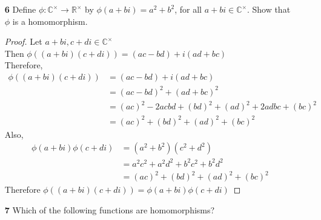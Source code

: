 \documentclass[paper=usletter, fontsize=12pt]{article}
\begin{document}
\begin{itemize}
\begin{enumerate}
\begin{proof}
                Let $x,y \in G$\\
                Then $\phi(xy)=(xy)^n$\\
                Since $G$ is abelian,
                \begin{align*}
                    (xy)^n & = x^ny^n\\
                    & = \phi(x)\phi(y)
                \end{align*}
                Therefore, $\phi(xy)=\phi(x)\phi(y)$ $\forall x,y \in G$ \qedhere

            \end{proof}

            \item[\textbf{6}] Define $\phi:
            \mathbb{C}^{\times}\rightarrow\mathbb{R}^{\times}$ by
            $\phi(a+bi)=a^2+b^2$, for all $a+bi\in \mathbb{C}^{\times}$. Show
            that $\phi$ is a homomorphism.
            \begin{proof}

                Let $a+bi,c+di \in \mathbb{C}^{\times}$\\
                Then $\phi((a+bi)(c+di))=(ac-bd)+i(ad+bc)$\\
                Therefore,
                \begin{align*}
                    \phi((a+bi)(c+di)) & = (ac-bd)+i(ad+bc)\\
                    & = (ac-bd)^2+(ad+bc)^2\\
                    & = (ac)^2-2acbd+(bd)^2+(ad)^2+2adbc+(bc)^2\\
                    & = (ac)^2+(bd)^2+(ad)^2+(bc)^2
                \end{align*}
                Also,
                \begin{align*}
                    \phi(a+bi)\phi(c+di) & = (a^2+b^2)(c^2+d^2)\\
                    & = a^2c^2+a^2d^2+b^2c^2+b^2d^2\\
                    & = (ac)^2+(bd)^2+(ad)^2+(bc)^2
                \end{align*}
                Therefore $\phi((a+bi)(c+di))=\phi(a+bi)\phi(c+di)$ \qedhere

            \end{proof}

            \item[\textbf{7}] Which of the following functions are
            homomorphisms?
            \begin{enumerate}


\end{enumerate}
\end{enumerate}
\end{itemize}
\end{document}
